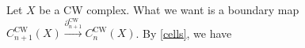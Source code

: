 Let $X$ be a CW complex. What we want is a boundary map $C_{n+1}^{\text{CW}}(X)\overset{\partial _{n+1}^{\text{CW}}}{\longrightarrow}C_n ^{\text{CW}}(X) $. By \cref{cells}, we have
